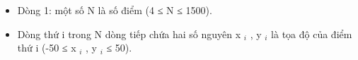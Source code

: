 \begin{itemize}
	\item     Dòng 1: một số N là số điểm (4 ≤ N ≤ 1500).   
	\item     Dòng thứ i trong N dòng tiếp chứa hai số nguyên   x    $_     i    $    , y    $_     i    $    là tọa độ của điểm thứ i (-50   ≤ x    $_     i    $    , y    $_     i    $    ≤ 50).   
\end{itemize}